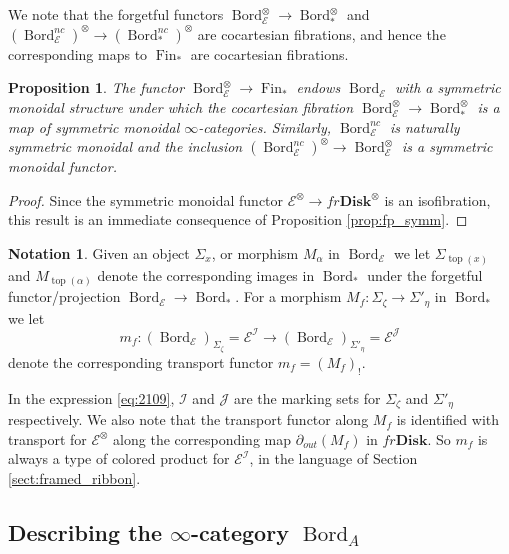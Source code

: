 \documentclass[reqno]{amsart}
\newtheorem{proposition}[lemma]{Proposition}
\theoremstyle{definition}
\newtheorem{notation}[lemma]{Notation}
\newcommand{\mcl}[1]{\mathcal{#1}}
\newcommand{\msc}[1]{\mathscr{#1}}
\newcommand{\opn}[1]{\operatorname{#1}}
\newcommand{\ot}{\otimes}
\newcommand{\Disk}{\mathbf{Disk}}
\DeclareMathOperator{\Fin}{Fin}
\DeclareMathOperator{\Bord}{Bord}
\renewcommand{\1}{\mathbf{1}}
\begin{document}
We note that the forgetful functors $\Bord_{\msc{E}}^{\ot}\to \Bord^{\ot}_{\ast}$ and $(\Bord_{\msc{E}}^{nc})^{\ot}\to (\Bord_{\ast}^{nc})^{\ot}$ are cocartesian fibrations, and hence the corresponding maps to $\Fin_{\ast}$ are cocartesian fibrations.

\begin{proposition}\label{prop:bord_e}
The functor $\Bord_{\msc{E}}^{\ot}\to \opn{Fin}_{\ast}$ endows $\Bord_{\msc{E}}$ with a symmetric monoidal structure under which the cocartesian fibration $\Bord_{\msc{E}}^{\ot}\to \Bord_{\ast}^{\ot}$ is a map of symmetric monoidal $\infty$-categories.  Similarly, $\Bord_{\msc{E}}^{nc}$ is naturally symmetric monoidal and the inclusion $(\Bord_{\msc{E}}^{nc})^{\ot}\to \Bord_{\msc{E}}^{\ot}$ is a symmetric monoidal functor.
\end{proposition}

\begin{proof}
Since the symmetric monoidal functor $\msc{E}^{\ot}\to fr\Disk^{\ot}$ is an isofibration, this result is an immediate consequence of Proposition \ref{prop:fp_symm}.
\end{proof}

\begin{notation}\label{not:labeled_unlabeled}
Given an object $\Sigma_x$, or morphism $M_{\alpha}$ in $\Bord_{\msc{E}}$ we let $\Sigma_{\opn{top}(x)}$ and $M_{\opn{top}(\alpha)}$ denote the corresponding images in $\Bord_{\ast}$ under the forgetful functor/projection $\Bord_{\msc{E}}\to \Bord_{\ast}$. For a morphism $M_f:\Sigma_{\zeta}\to \Sigma'_{\eta}$ in $\Bord_{\ast}$ we let
\begin{equation}\label{eq:2109}
m_f:(\Bord_{\msc{E}})_{\Sigma_{\zeta}}=\msc{E}^{\mcl{I}}\to (\Bord_{\msc{E}})_{\Sigma'_{\eta}}=\msc{E}^{\mcl{J}}
\end{equation}
denote the corresponding transport functor $m_f=(M_f)_!$.
\end{notation}

In the expression \eqref{eq:2109}, $\mcl{I}$ and $\mcl{J}$ are the marking sets for $\Sigma_{\zeta}$ and $\Sigma'_{\eta}$ respectively.  We also note that the transport functor along $M_f$ is identified with transport for $\msc{E}^{\ot}$ along the corresponding map $\partial_{out}(M_f)$ in $fr\Disk$. So $m_f$ is always a type of colored product for $\msc{E}^{\mcl{I}}$, in the language of Section \ref{sect:framed_ribbon}.

\subsection{Describing the $\infty$-category $\Bord_A$}
\label{sect:des_bord_a}
\end{document}
